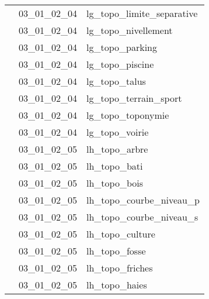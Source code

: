 \documentclass[12pt,titlepage,oneside]{book}
\begin{document}
\begin{supertabular}{|p{10cm}|c|p{15cm}|}
                    & 03\_01\_02\_04 & lg\_topo\_limite\_separative\\


                    & 03\_01\_02\_04 & lg\_topo\_nivellement\\


                    & 03\_01\_02\_04 & lg\_topo\_parking\\


                    & 03\_01\_02\_04 & lg\_topo\_piscine\\


                    & 03\_01\_02\_04 & lg\_topo\_talus\\


                    & 03\_01\_02\_04 & lg\_topo\_terrain\_sport\\


                    & 03\_01\_02\_04 & lg\_topo\_toponymie\\


                    & 03\_01\_02\_04 & lg\_topo\_voirie\\


                    & 03\_01\_02\_05 & lh\_topo\_arbre\\


                    & 03\_01\_02\_05 & lh\_topo\_bati\\


                    & 03\_01\_02\_05 & lh\_topo\_bois\\


                    & 03\_01\_02\_05 & lh\_topo\_courbe\_niveau\_p\\


                    & 03\_01\_02\_05 & lh\_topo\_courbe\_niveau\_s\\


                    & 03\_01\_02\_05 & lh\_topo\_culture\\


                    & 03\_01\_02\_05 & lh\_topo\_fosse\\


                    & 03\_01\_02\_05 & lh\_topo\_friches\\


                    & 03\_01\_02\_05 & lh\_topo\_haies\\



\end{supertabular}
\end{document}
